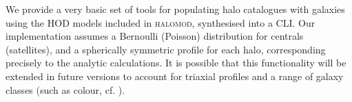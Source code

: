 \documentclass[5p,aas_macros]{elsarticle}
\newcommand{\framework}{\texttt{Framework}}
\newcommand{\component}{\texttt{Component}}
\begin{document}
We provide a very basic set of tools for populating halo catalogues with galaxies using the HOD models included in \textsc{halomod}, synthesised into a CLI. Our implementation assumes a Bernoulli (Poisson) distribution for centrals (satellites), and a spherically symmetric profile for each halo, corresponding precisely to the analytic calculations. It is possible that this functionality will be extended in future versions to account for triaxial profiles \citep{Jing2002} and a range of galaxy classes (such as colour, cf. \citet{Skibba2009}). 




\end{document}
